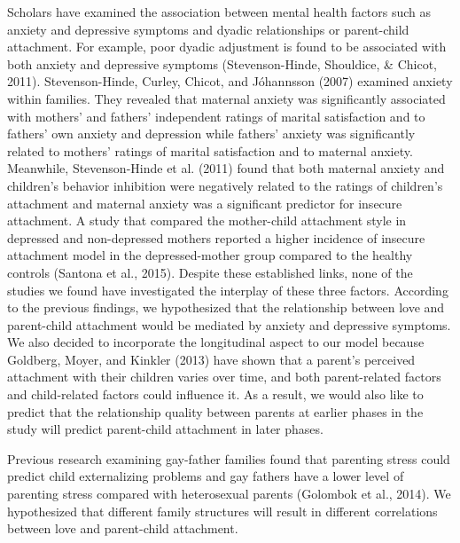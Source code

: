 \documentclass[man]{apa6}
\begin{document}
Scholars have examined the association between mental health factors such as anxiety and depressive symptoms and dyadic relationships or parent-child attachment. For example, poor dyadic adjustment is found to be associated with both anxiety and depressive symptoms (Stevenson-Hinde, Shouldice, \& Chicot, 2011). Stevenson-Hinde, Curley, Chicot, and Jóhannsson (2007) examined anxiety within families. They revealed that maternal anxiety was significantly associated with mothers' and fathers' independent ratings of marital satisfaction and to fathers' own anxiety and depression while fathers' anxiety was significantly related to mothers' ratings of marital satisfaction and to maternal anxiety. Meanwhile, Stevenson-Hinde et al. (2011) found that both maternal anxiety and children's behavior inhibition were negatively related to the ratings of children's attachment and maternal anxiety was a significant predictor for insecure attachment. A study that compared the mother-child attachment style in depressed and non-depressed mothers reported a higher incidence of insecure attachment model in the depressed-mother group compared to the healthy controls (Santona et al., 2015). Despite these established links, none of the studies we found have investigated the interplay of these three factors. According to the previous findings, we hypothesized that the relationship between love and parent-child attachment would be mediated by anxiety and depressive symptoms. We also decided to incorporate the longitudinal aspect to our model because Goldberg, Moyer, and Kinkler (2013) have shown that a parent's perceived attachment with their children varies over time, and both parent-related factors and child-related factors could influence it. As a result, we would also like to predict that the relationship quality between parents at earlier phases in the study will predict parent-child attachment in later phases.

Previous research examining gay-father families found that parenting stress could predict child externalizing problems and gay fathers have a lower level of parenting stress compared with heterosexual parents (Golombok et al., 2014). We hypothesized that different family structures will result in different correlations between love and parent-child attachment.
\end{document}
